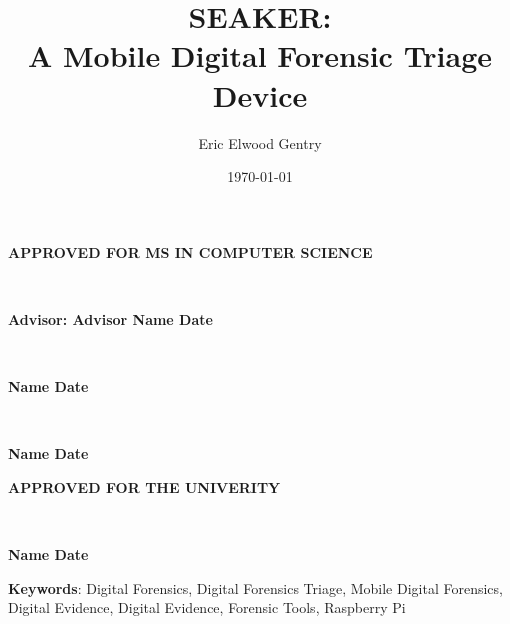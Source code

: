 \documentclass[12pt]{article}
\newcommand{\A}{\mathcal{A}}
\begin{document}
\begin{center}
{\large \bfseries APPROVED FOR MS IN COMPUTER SCIENCE \par}

\vspace{1.5 cm}

\hrulefill\\
{\large \bfseries Advisor: Advisor Name \hfill Date \par}

\vspace{1.5 cm}

\hrulefill\\
{\large \bfseries Name \hfill Date \par}

\vspace{1.5 cm}

\hrulefill\\
{\large \bfseries Name \hfill Date \par}

\vspace{3 cm}

{\large \bfseries APPROVED FOR THE UNIVERITY \par}

\vspace{1.5 cm}

\hrulefill\\
{\large \bfseries Name \hfill Date \par}
\end{center}

\newpage



\newpage

\title{SEAKER:\protect\\A Mobile Digital Forensic Triage Device} 
\author{Eric Elwood Gentry}

\date{\today}
\maketitle

\small{\textbf{Keywords}: Digital Forensics, Digital Forensics Triage, Mobile Digital Forensics,
Digital Evidence, Digital Evidence, Forensic Tools, Raspberry Pi}
\\
\end{document}

